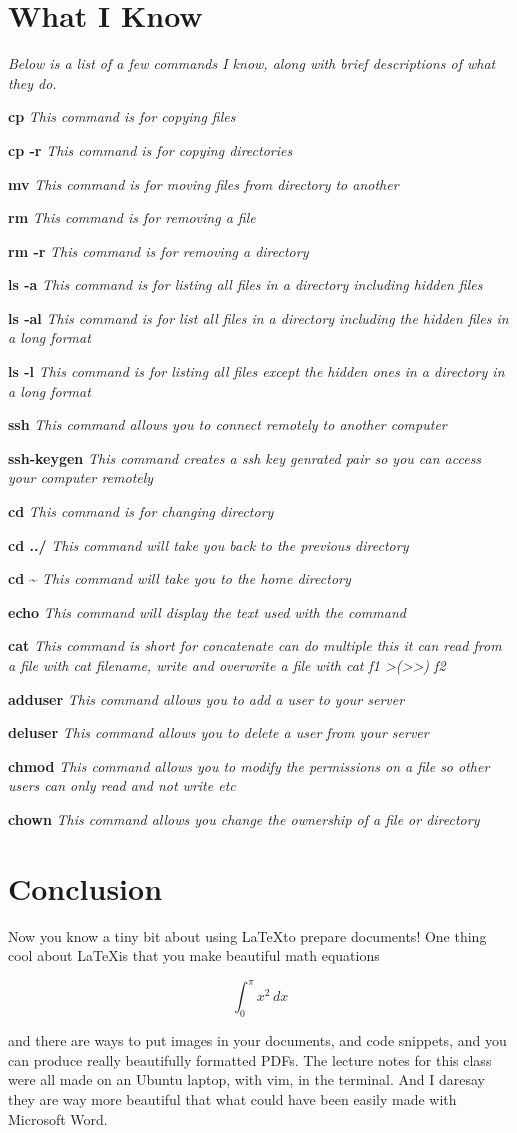 \documentclass[11pt]{article}
\newcommand{\iknow}[2]{\par\textbf{#1} \textit{#2}}
\begin{document}
\section*{What I Know}

\noindent\textit{Below is a list of a few commands I know, along with brief descriptions of what they do.}
\iknow{cp}{This command is for copying files}
\iknow{cp -r}{This command is for copying directories}
\iknow{mv}{This command is for moving files from directory to another}
\iknow{rm}{This command is for removing a file}
\iknow{rm -r}{This command is for removing a directory}
\iknow{ls -a}{This command is for listing all files in a directory including hidden files}
\iknow{ls -al}{This command is for list all files in a directory including the hidden files in a long format}
\iknow{ls -l}{This command is for listing all files except the hidden ones in a directory in a long format}
\iknow{ssh}{This command allows you to connect remotely to another computer}
\iknow{ssh-keygen}{This command creates a ssh key genrated pair so you can access your computer remotely}
\iknow{cd}{This command is for changing directory}
\iknow{cd ../}{This command will take you back to the previous directory}
\iknow{cd \textasciitilde}{This command will take you to the home directory}
\iknow{echo}{This command will display the text used with the command}
\iknow{cat}{This command is short for concatenate can do multiple this it can read from a file with cat filename, write and overwrite a file with cat f1 >(>>) f2 }
\iknow{adduser}{This command allows you to add a user to your server}
\iknow{deluser}{This command allows you to delete a user from your server}
\iknow{chmod}{This command allows you to modify the permissions on a file so other users can only read and not write etc}
\iknow{chown}{This command allows you change the ownership of a file or directory}

\section*{Conclusion}
Now you know a tiny bit about using \LaTeX to prepare documents! One thing cool about \LaTeX is that you make beautiful math equations

\begin{equation}
\int_{0}^{\pi}x^2\,dx
\end{equation}

and there are ways to put images in your documents, and code snippets, and you can produce really beautifully formatted PDFs. The lecture notes for this class were all made on an Ubuntu laptop, with vim, in the terminal. And I daresay they are way more beautiful that what could have been easily made with Microsoft Word.
\end{document}
